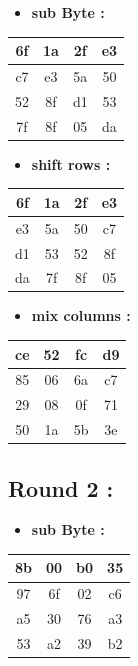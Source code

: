 \documentclass{article}
\begin{document}
\begin{itemize}
    \item \textbf{sub Byte :}
\end{itemize} \begin{tabular}{|c|c|c|c|}
\hline 6f & 1a & 2f & e3 \\ \hline c7 & e3 & 5a & 50 \\ \hline 52 & 8f & d1 & 53 \\ \hline 7f & 8f & 05 & da \\ \hline \end{tabular}\hspace{0.5cm}\vspace{0.1cm}\begin{itemize}
    \item \textbf{shift rows :}
\end{itemize} \begin{tabular}{|c|c|c|c|}
\hline 6f & 1a & 2f & e3 \\ \hline e3 & 5a & 50 & c7 \\ \hline d1 & 53 & 52 & 8f \\ \hline da & 7f & 8f & 05 \\ \hline \end{tabular}\hspace{0.5cm}\vspace{0.1cm}\begin{itemize}
    \item \textbf{mix columns :}
\end{itemize} \begin{tabular}{|c|c|c|c|}
\hline ce & 52 & fc & d9 \\ \hline 85 & 06 & 6a & c7 \\ \hline 29 & 08 & 0f & 71 \\ \hline 50 & 1a & 5b & 3e \\ \hline \end{tabular}\hspace{0.5cm}\vspace{0.1cm}\subsection*{Round 2 : }\begin{itemize}
    \item \textbf{sub Byte :}
\end{itemize} \begin{tabular}{|c|c|c|c|}
\hline 8b & 00 & b0 & 35 \\ \hline 97 & 6f & 02 & c6 \\ \hline a5 & 30 & 76 & a3 \\ \hline 53 & a2 & 39 & b2 \\ \hline \end{tabular}\hspace{0.5cm}\vspace{0.1cm}\begin{itemize}

\end{itemize}
\end{document}
